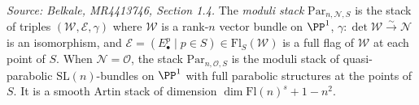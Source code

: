 \begin{definition}[ParabolicStack]
  \label{def:par-stack}
  \uses{}
  \textit{Source: Belkale, MR4413746, Section 1.4.}
  The \emph{moduli stack} \(\mathrm{Par}_{n,\mathcal{N},S}\) is the stack of triples \((\mathcal{W}, \mathcal{E}, \gamma)\) where \(\mathcal{W}\) is a rank-\(n\) vector bundle on \(\PP^1\), \(\gamma: \det \mathcal{W} \xrightarrow{\sim} \mathcal{N}\) is an isomorphism, and \(\mathcal{E} = (E^p_\bullet \mid p \in S) \in \mathrm{Fl}_S(\mathcal{W})\) is a full flag of \(\mathcal{W}\) at each point of \(S\). When \(\mathcal{N} = \mathcal{O}\), the stack \(\mathrm{Par}_{n,\mathcal{O},S}\) is the moduli stack of quasi-parabolic \(\mathrm{SL}(n)\)-bundles on \(\PP^1\) with full parabolic structures at the points of \(S\). It is a smooth Artin stack of dimension \(\dim \mathrm{Fl}(n)^s + 1 - n^2\).
\end{definition}

